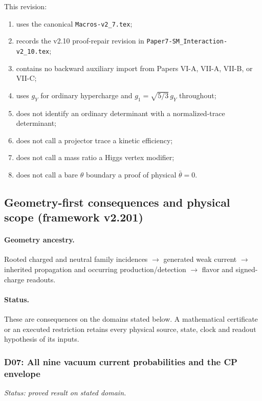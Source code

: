 \documentclass[12pt,a4paper]{article}
\begin{document}
This revision:
\begin{enumerate}[label=(\roman*),leftmargin=2.5em]
  \item uses the canonical \texttt{Macros-v2\_7.tex};
  \item records the v2.10 proof-repair revision in
  \texttt{Paper7-SM\_Interaction-v2\_10.tex};
  \item contains no backward auxiliary import from Papers VI-A, VII-A, VII-B, or VII-C;
  \item uses \(g_Y\) for ordinary hypercharge and \(g_1=\sqrt{5/3}\,g_Y\)
  throughout;
  \item does not identify an ordinary determinant with a normalized-trace
  determinant;
  \item does not call a projector trace a kinetic efficiency;
  \item does not call a mass ratio a Higgs vertex modifier;
  \item does not call a bare \(\theta\) boundary a proof of physical
  \(\bar\theta=0\).
\end{enumerate}

\subsection{Geometry-first consequences and physical scope (framework v2.201)}
\label{p5c:sec:v2201-geometry-first-consequences}
\paragraph{Geometry ancestry.}
Rooted charged and neutral family incidences $\to$ generated weak current $\to$ inherited propagation and occurring production/detection $\to$ flavor and signed-charge readouts.
\paragraph{Status.}
These are consequences on the domains stated below.
A mathematical certificate or an executed restriction retains every
physical source, state, clock and readout hypothesis of its inputs.

\subsubsection{D07: All nine vacuum current probabilities and the CP envelope}
\label{p5c:sec:v2201-derived-d07}
\noindent\textit{Status: proved result on stated domain.}
\end{document}

